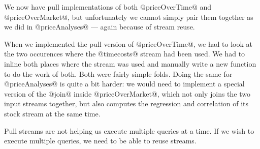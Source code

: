 We now have pull implementations of both @priceOverTime@ and @priceOverMarket@, but unfortunately we cannot simply pair them together as we did in @priceAnalyses@ --- again because of stream reuse.

When we implemented the pull version of @priceOverTime@, we had to look at the two occurences where the @timecosts@ stream had been used.
We had to inline both places where the stream was used and manually write a new function to do the work of both.
Both were fairly simple folds.
Doing the same for @priceAnalyses@ is quite a bit harder: we would need to implement a special version of the @join@ inside @priceOverMarket@, which not only joins the two input streams together, but also computes the regression and correlation of its stock stream at the same time.

Pull streams are not helping us execute multiple queries at a time.
If we wish to execute multiple queries, we need to be able to reuse streams.


